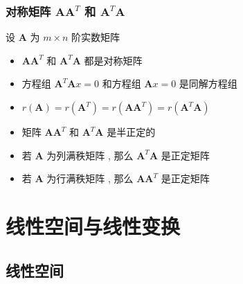 \documentclass{article}
\begin{document}
			\subsubsection{对称矩阵 $\boldsymbol A \boldsymbol A^{T}$ 和 $\boldsymbol A^{T} \boldsymbol A$}
				设 $\boldsymbol A$ 为 $m \times n$ 阶实数矩阵
				\begin{itemize}
					\item $\boldsymbol A \boldsymbol A^{T}$ 和 $\boldsymbol A^{T} \boldsymbol A$ 都是对称矩阵
					\item 方程组 $\boldsymbol A^{T} \boldsymbol A x=0$ 和方程组 $\boldsymbol A x=0$ 是同解方程组
					\item $r(\boldsymbol A)=r\left(\boldsymbol A^{T}\right)=r\left(\boldsymbol A \boldsymbol A^{T}\right)=r\left(\boldsymbol A^{T} \boldsymbol A\right)$
					\item 矩阵 $\boldsymbol A \boldsymbol A^{T}$ 和 $\boldsymbol A^{T} \boldsymbol A$ 是半正定的
					\item 若 $\boldsymbol A$ 为列满秩矩阵 , 那么 $\boldsymbol A^{T} \boldsymbol A$ 是正定矩阵
					\item 若 $\boldsymbol A$ 为行满秩矩阵 , 那么 $\boldsymbol A \boldsymbol A^{T}$ 是正定矩阵
				\end{itemize}
	\section{线性空间与线性变换}
		\subsection{线性空间}
\end{document}
